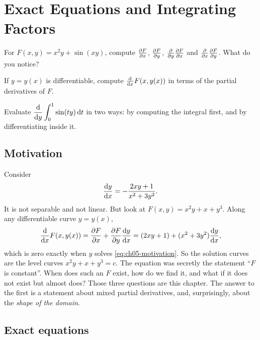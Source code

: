 \chapter{Exact Equations and Integrating Factors}\label{ch:ch05}

\begin{diagnostic}
  \item For $F(x,y) = x^2y + \sin(xy)$, compute $\frac{\partial F}{\partial x}$, $\frac{\partial F}{\partial y}$,
        $\frac{\partial }{\partial y}\frac{\partial F}{\partial x}$ and $\frac{\partial }{\partial x}\frac{\partial F}{\partial y}$. What do you notice?
  \item If $y = y(x)$ is differentiable, compute $\frac{\mathrm{d}}{\mathrm{d}x}F(x,y(x))$ in terms of
        the partial derivatives of $F$.
  \item Evaluate $\displaystyle\frac{\mathrm{d}}{\mathrm{d}y}\int_0^1 \sin(ty)\,\mathrm{d}t$ in two ways:
        by computing the integral first, and by differentiating inside it.
\end{diagnostic}

\section{Motivation}\label{sec:ch05-motivation}

Consider
\begin{equation}\label{eq:ch05-motivation}
  \frac{\mathrm{d}y}{\mathrm{d}x} = -\frac{2xy + 1}{x^2 + 3y^2}.
\end{equation}
It is not separable and not linear. But look at $F(x,y) = x^2y + x + y^3$. Along
any differentiable curve $y = y(x)$,
\[
  \frac{\mathrm{d}}{\mathrm{d}x}F(x,y(x)) = \frac{\partial F}{\partial x} + \frac{\partial F}{\partial y}\frac{\mathrm{d}y}{\mathrm{d}x}
  = (2xy + 1) + (x^2 + 3y^2)\frac{\mathrm{d}y}{\mathrm{d}x},
\]
which is zero exactly when $y$ solves \eqref{eq:ch05-motivation}. So the
solution curves are the level curves $x^2y + x + y^3 = c$. The equation was
secretly the statement ``$F$ is constant''. When does such an $F$ exist, how do
we find it, and what if it does not exist but almost does? Those three
questions are this chapter. The answer to the first is a statement about
mixed partial derivatives, and, surprisingly, about the \emph{shape of the
domain}.

\section{Exact equations}\label{sec:ch05-exact}

